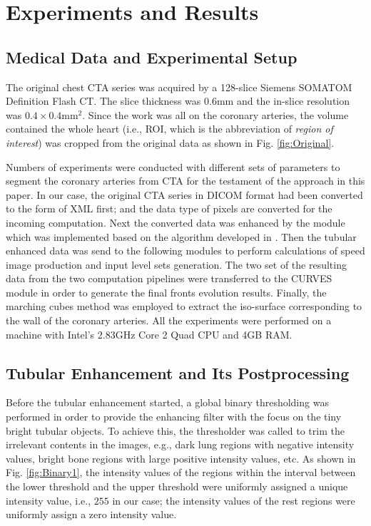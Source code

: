 
\section{Experiments and Results}
\label{sec4_3}

\subsection{Medical Data and Experimental Setup}

The original chest CTA series was acquired by a 128-slice Siemens SOMATOM Definition Flash CT.
The slice thickness was $0.6 \text{mm}$ and the in-slice resolution was $0.4 \times 0.4 \text{mm}^2$.
Since the work was all on the coronary arteries, the volume contained the whole heart (i.e., ROI, which is the abbreviation of \textit{region of interest}) was cropped from the original data as shown in Fig. \ref{fig:Original}. %

Numbers of experiments were conducted with different sets of parameters to segment the coronary arteries from CTA for the testament of the approach in this paper.
In our case, the original CTA series in DICOM format had been converted to the form of XML first; and the data type of pixels are converted for the incoming computation.
Next the converted data was enhanced by the module which was implemented based on the algorithm developed in \cite{Sato1998}.
Then the tubular enhanced data was send to the following modules to perform calculations of speed image production and input level sets generation.
The two set of the resulting data from the two computation pipelines were transferred to the CURVES module in order to generate the final fronts evolution results.
Finally, the marching cubes method was employed to extract the iso-surface corresponding to the wall of the coronary arteries.
All the experiments were performed on a machine with Intel's 2.83GHz Core 2 Quad CPU and 4GB RAM.

\subsection{Tubular Enhancement and Its Postprocessing}

Before the tubular enhancement started, a global binary thresholding was performed in order to provide the enhancing filter with the focus on the tiny bright tubular objects.
To achieve this, the thresholder was called to trim the irrelevant contents in the images, e.g., dark lung regions with negative intensity values, bright bone regions with large positive intensity values, etc. %
As shown in Fig. \ref{fig:Binary1}, the intensity values of the regions within the interval between the lower threshold and the upper threshold were uniformly assigned a unique intensity value, i.e., $255$ in our case; the intensity values of the rest regions were uniformly assign a zero intensity value. %

